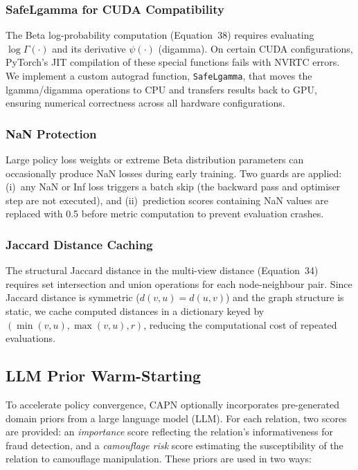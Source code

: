 \subsubsection{SafeLgamma for CUDA Compatibility}
The Beta log-probability computation (Equation~38) requires evaluating \( \log \Gamma(\cdot) \) and its derivative \( \psi(\cdot) \) (digamma). On certain CUDA configurations, PyTorch's JIT compilation of these special functions fails with NVRTC errors. We implement a custom autograd function, \texttt{SafeLgamma}, that moves the lgamma/digamma operations to CPU and transfers results back to GPU, ensuring numerical correctness across all hardware configurations.

\subsubsection{NaN Protection}
Large policy loss weights or extreme Beta distribution parameters can occasionally produce NaN losses during early training. Two guards are applied: (i)~any NaN or Inf loss triggers a batch skip (the backward pass and optimiser step are not executed), and (ii)~prediction scores containing NaN values are replaced with 0.5 before metric computation to prevent evaluation crashes.

\subsubsection{Jaccard Distance Caching}
The structural Jaccard distance in the multi-view distance (Equation~34) requires set intersection and union operations for each node-neighbour pair. Since Jaccard distance is symmetric ($d(v,u) = d(u,v)$) and the graph structure is static, we cache computed distances in a dictionary keyed by $(\min(v,u), \max(v,u), r)$, reducing the computational cost of repeated evaluations.

\subsection{LLM Prior Warm-Starting}
\label{sec:llm-warm-start}

To accelerate policy convergence, CAPN optionally incorporates pre-generated domain priors from a large language model (LLM). For each relation, two scores are provided: an \textit{importance} score reflecting the relation's informativeness for fraud detection, and a \textit{camouflage risk} score estimating the susceptibility of the relation to camouflage manipulation. These priors are used in two ways:

